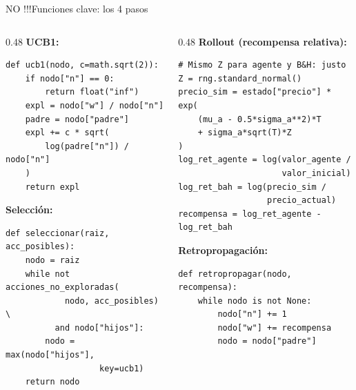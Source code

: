 \documentclass[aspectratio=169, 10pt]{beamer}
\begin{document}
\begin{frame}[fragile]{NO !!!Funciones clave: los 4 pasos}
  \begin{columns}[T]
    \begin{column}{0.48\textwidth}
      \textbf{UCB1:}
\begin{lstlisting}
def ucb1(nodo, c=math.sqrt(2)):
    if nodo["n"] == 0:
        return float("inf")
    expl = nodo["w"] / nodo["n"]
    padre = nodo["padre"]
    expl += c * sqrt(
        log(padre["n"]) / nodo["n"]
    )
    return expl
\end{lstlisting}

      \vspace{0.2cm}
      \textbf{Selección:}
\begin{lstlisting}
def seleccionar(raiz, acc_posibles):
    nodo = raiz
    while not acciones_no_exploradas(
            nodo, acc_posibles) \
          and nodo["hijos"]:
        nodo = max(nodo["hijos"],
                   key=ucb1)
    return nodo
\end{lstlisting}
    \end{column}
    \begin{column}{0.48\textwidth}
      \textbf{Rollout (recompensa relativa):}
\begin{lstlisting}
# Mismo Z para agente y B&H: justo
Z = rng.standard_normal()
precio_sim = estado["precio"] * exp(
    (mu_a - 0.5*sigma_a**2)*T
    + sigma_a*sqrt(T)*Z
)
log_ret_agente = log(valor_agente /
                     valor_inicial)
log_ret_bah = log(precio_sim /
                  precio_actual)
recompensa = log_ret_agente - log_ret_bah
\end{lstlisting}
      \vspace{0.1cm}
      \textbf{Retropropagación:}
\begin{lstlisting}
def retropropagar(nodo, recompensa):
    while nodo is not None:
        nodo["n"] += 1
        nodo["w"] += recompensa
        nodo = nodo["padre"]
\end{lstlisting}
    \end{column}
  \end{columns}
\end{frame}
\end{document}
